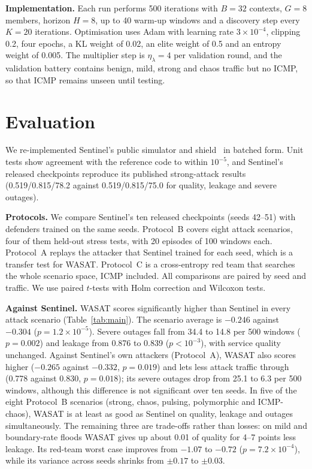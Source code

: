 \documentclass[journal]{IEEEtran}
\begin{document}
\textbf{Implementation.} Each run performs 500 iterations with $B=32$ contexts, $G=8$ members, horizon $H=8$, up to 40 warm-up windows and a discovery step every $K=20$ iterations. Optimisation uses Adam with learning rate $3\times10^{-4}$, clipping 0.2, four epochs, a KL weight of 0.02, an elite weight of 0.5 and an entropy weight of 0.005. The multiplier step is $\eta_\lambda=4$ per validation round, and the validation battery contains benign, mild, strong and chaos traffic but no ICMP, so that ICMP remains unseen until testing.

\section{Evaluation}
\label{sec:eval}
We re-implemented Sentinel's public simulator and shield~\cite{sentinelcode} in batched form. Unit tests show agreement with the reference code to within $10^{-5}$, and Sentinel's released checkpoints reproduce its published strong-attack results (0.519/0.815/78.2 against 0.519/0.815/75.0 for quality, leakage and severe outages).

\textbf{Protocols.} We compare Sentinel's ten released checkpoints (seeds 42--51) with defenders trained on the same seeds. Protocol~B covers eight attack scenarios, four of them held-out stress tests, with 20 episodes of 100 windows each. Protocol~A replays the attacker that Sentinel trained for each seed, which is a transfer test for WASAT. Protocol~C is a cross-entropy red team that searches the whole scenario space, ICMP included. All comparisons are paired by seed and traffic. We use paired $t$-tests with Holm correction and Wilcoxon tests.



\textbf{Against Sentinel.} WASAT scores significantly higher than Sentinel in every attack scenario (Table~\ref{tab:main}). The scenario average is $-0.246$ against $-0.304$ ($p=1.2\times10^{-5}$). Severe outages fall from 34.4 to 14.8 per 500 windows ($p=0.002$) and leakage from 0.876 to 0.839 ($p<10^{-3}$), with service quality unchanged. Against Sentinel's own attackers (Protocol~A), WASAT also scores higher ($-0.265$ against $-0.332$, $p=0.019$) and lets less attack traffic through (0.778 against 0.830, $p=0.018$); its severe outages drop from 25.1 to 6.3 per 500 windows, although this difference is not significant over ten seeds. In five of the eight Protocol~B scenarios (strong, chaos, pulsing, polymorphic and ICMP-chaos), WASAT is at least as good as Sentinel on quality, leakage and outages simultaneously. The remaining three are trade-offs rather than losses: on mild and boundary-rate floods WASAT gives up about 0.01 of quality for 4--7 points less leakage. Its red-team worst case improves from $-1.07$ to $-0.72$ ($p=7.2\times10^{-4}$), while its variance across seeds shrinks from $\pm0.17$ to $\pm0.03$.
\end{document}
